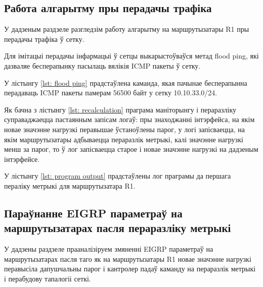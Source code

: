 

\subsection{Работа алгарытму пры перадачы трафіка}

У дадзеным раздзеле разгледзім работу алгарытму на маршрутызатары R1 пры
перадачы трафіка ў сетку.

Для імітацыі перадачы інфармацыі ў сетцы выкарыстоўваўся метад flood ping,
які дазваляе бесперапынку пасылаць вялікія ICMP пакеты ў сетку.

У лістынгу \ref{lst: flood ping} прадстаўлена каманда, якая пачынае 
бесперапынна перадаваць ICMP пакеты памерам 56500 байт у сетку 10.10.33.0/24.



Як бачна з лістынгу \ref{lst: recalculation} праграма маніторынгу і пераразліку суправаджаецца пастаянным
запісам логаў: пры знаходжанні інтэрфейса, на якім новае значэнне нагрузкі перавышае ўстаноўлены парог,
у логі запісваецца, на якім маршрутызатары адбываецца пераразлік метрыкі, калі значэнне нагрузкі менш за парог,
то ў лог запісваецца старое і новае значэнне нагрузкі на дадзеным інтэрфейсе.

У лістынгу \ref{lst: program output} прадстаўлены лог праграмы да першага пераліку метрыкі для маршрутызатара R1.



\subsection{Параўнанне EIGRP параметраў на маршрутызатарах пасля пераразліку метрыкі}

У дадзены раздзеле прааналізіруем змяненні EIGRP параметраў на маршрутызатарах пасля таго як
на маршрутызатары R1 новае значэнне нагрузкі перавысіла дапушчальны парог і кантролер падаў
каманду на пераразлік метрыкі і перабудову тапалогіі сеткі.

